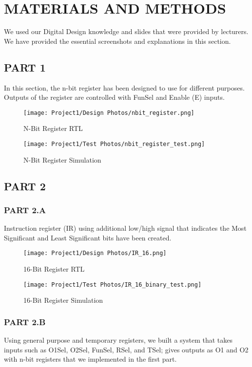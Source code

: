 \documentclass[pdftex,12pt,a4paper]{article}
\begin{document}
\section{MATERIALS AND METHODS}
We used our Digital Design knowledge and slides that were provided by lecturers. We have provided the essential screenshots and explanations in this section.

\subsection{PART 1}
In this section, the n-bit register has been designed to use for different purposes. Outputs of the register are controlled with FunSel and Enable (E) inputs.


\begin{figure}[H]
	\centering
	\texttt{[image: Project1/Design Photos/nbit\_register.png]}	
	\caption{N-Bit Register RTL}
	\label{figone}
\end{figure}

\begin{figure}[H]
	\centering
	\texttt{[image: Project1/Test Photos/nbit\_register\_test.png]}	
	\caption{N-Bit Register Simulation}
	\label{figtwo}
\end{figure}

\subsection{PART 2}


\subsubsection{PART 2.A}
Instruction register (IR) using additional low/high signal that indicates the Most Significant and Least Significant bits have been created. 

\begin{figure}[H]
	\centering
	\texttt{[image: Project1/Design Photos/IR\_16.png]}	
	\caption{16-Bit Register RTL}
	\label{figthree}
\end{figure}

\begin{figure}[H]
	\centering
	\texttt{[image: Project1/Test Photos/IR\_16\_binary\_test.png]}	
	\caption{16-Bit Register Simulation}
	\label{figfour}
\end{figure}


\subsubsection{PART 2.B}
Using general purpose and temporary registers,  we built a system that takes inputs such as O1Sel, O2Sel, FunSel, RSel, and TSel; gives outputs as O1 and O2 with n-bit registers that we implemented in the first part.
\end{document}
